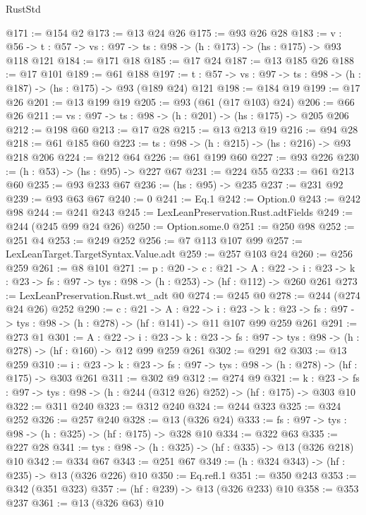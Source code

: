\begin{lexlean}{RustStd}
\begin{coremodule}
@171 := @154 @2
@173 := @13 @24 @26
@175 := @93 @26 @28
@183 := {v : @56} ->
  {t : @57} -> {vs : @97} -> {ts : @98} -> (h : @173) -> (hs : @175) -> @93 @118 @121
@184 := @171 @18
@185 := @17 @24
@187 := @13 @185 @26
@188 := @17 @101
@189 := @61 @188
@197 := {t : @57} -> {vs : @97} -> {ts : @98} -> (h : @187) -> (hs : @175) -> @93 (@189 @24) @121
@198 := @184 @19
@199 := @17 @26
@201 := @13 @199 @19
@205 := @93 (@61 (@17 @103) @24)
@206 := @66 @26
@211 := {vs : @97} -> {ts : @98} -> (h : @201) -> (hs : @175) -> @205 @206
@212 := @198 @60
@213 := @17 @28
@215 := @13 @213 @19
@216 := @94 @28
@218 := @61 @185 @60
@223 := {ts : @98} -> (h : @215) -> (hs : @216) -> @93 @218 @206
@224 := @212 @64
@226 := @61 @199 @60
@227 := @93 @226
@230 := (h : @53) -> (hs : @95) -> @227 @67
@231 := @224 @55
@233 := @61 @213 @60
@235 := @93 @233 @67
@236 := (hs : @95) -> @235
@237 := @231 @92
@239 := @93 @63 @67
@240 := 0
@241 := Eq.{1}
@242 := Option.{0}
@243 := @242 @98
@244 := @241 @243
@245 := LexLeanPreservation.Rust.adtFields
@249 := @244 (@245 @99 @24 @26)
@250 := Option.some.{0}
@251 := @250 @98
@252 := @251 @4
@253 := @249 @252
@256 := @7 @113 @107 @99
@257 := LexLeanTarget.TargetSyntax.Value.adt
@259 := @257 @103 @24
@260 := @256 @259
@261 := @8 @101
@271 := {p : @20} ->
  {c : @21} ->
  {A : @22} ->
  {i : @23} -> {k : @23} -> {fs : @97} -> {tys : @98} -> (h : @253) -> (hf : @112) -> @260 @261
@273 := LexLeanPreservation.Rust.wt_adt @0
@274 := @245 @0
@278 := @244 (@274 @24 @26) @252
@290 := {c : @21} ->
  {A : @22} ->
  {i : @23} ->
  {k : @23} -> {fs : @97} -> {tys : @98} -> (h : @278) -> (hf : @141) -> @11 @107 @99 @259 @261
@291 := @273 @1
@301 := {A : @22} ->
  {i : @23} ->
  {k : @23} -> {fs : @97} -> {tys : @98} -> (h : @278) -> (hf : @160) -> @12 @99 @259 @261
@302 := @291 @2
@303 := @13 @259
@310 := {i : @23} ->
  {k : @23} -> {fs : @97} -> {tys : @98} -> (h : @278) -> (hf : @175) -> @303 @261
@311 := @302 @9
@312 := @274 @9
@321 := {k : @23} ->
  {fs : @97} -> {tys : @98} -> (h : @244 (@312 @26) @252) -> (hf : @175) -> @303 @10
@322 := @311 @240
@323 := @312 @240
@324 := @244 @323
@325 := @324 @252
@326 := @257 @240
@328 := @13 (@326 @24)
@333 := {fs : @97} -> {tys : @98} -> (h : @325) -> (hf : @175) -> @328 @10
@334 := @322 @63
@335 := @227 @28
@341 := {tys : @98} -> (h : @325) -> (hf : @335) -> @13 (@326 @218) @10
@342 := @334 @67
@343 := @251 @67
@349 := (h : @324 @343) -> (hf : @235) -> @13 (@326 @226) @10
@350 := Eq.refl.{1}
@351 := @350 @243
@353 := @342 (@351 @323)
@357 := (hf : @239) -> @13 (@326 @233) @10
@358 := @353 @237
@361 := @13 (@326 @63) @10

\end{coremodule}
\end{lexlean}
